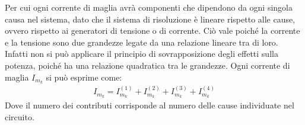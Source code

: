 \documentclass{article}
\numberwithin{equation}{subsection}
\begin{document}
Per cui ogni corrente di maglia avrà componenti che dipendono da ogni singola causa nel sistema, dato che il sistema di risoluzione è lineare rispetto alle cause, ovvero 
rispetto ai generatori di tensione o di corrente. Ciò vale poiché la corrente e la tensione sono due grandezze legate da una relazione lineare tra di loro. Infatti non si può 
applicare il principio di sovrapposizione degli effetti sulla potenza, poiché ha una relazione quadratica tra le grandezze. Ogni corrente di maglia $I_{m_k}$ si può esprime come:
\begin{gather*}
    I_{m_k}=I_{m_k}^{(1)}+I_{m_k}^{(2)}+I_{m_k}^{(3)}+I_{m_k}^{(4)}
\end{gather*}
Dove il numero dei contributi corrisponde al numero delle cause individuate nel circuito. 
\end{document}
